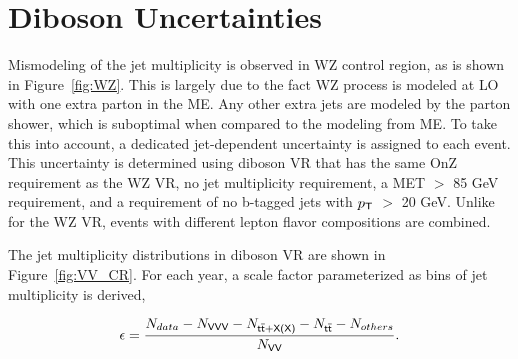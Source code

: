 \section{Diboson Uncertainties}
\label{sec:DiUnc}

Mismodeling of the jet multiplicity is observed in WZ control region, as is shown in Figure~\ref{fig:WZ}. This is largely due to the fact WZ process is modeled at \ac{LO} with one extra parton in the \ac{ME}. Any other extra jets are modeled by the parton shower, which is suboptimal when compared to the modeling from \ac{ME}. To take this into account, a dedicated jet-dependent uncertainty is assigned to each event. This uncertainty is determined using diboson \ac{VR} that has the same OnZ requirement as the WZ \ac{VR}, no jet multiplicity requirement, a \ac{MET} $>$ 85 GeV requirement, and a requirement of no b-tagged jets with $p_{\textsf{T}}$ $>$ 20 GeV. Unlike for the WZ \ac{VR}, events with different lepton flavor compositions are combined.

The jet multiplicity distributions in diboson \ac{VR} are shown in Figure~\ref{fig:VV_CR}. For each year, a scale factor parameterized as bins of jet multiplicity is derived,

\begin{equation}
\epsilon=\frac{N_{data}-N_{\textsf{VVV}}-N_{\textsf{t}\overline{\textsf{t}}+\textsf{X(X)}}-N_{\textsf{t}\overline{\textsf{t}}}-N_{others}}{N_{\textsf{VV}}}.
\end{equation}

